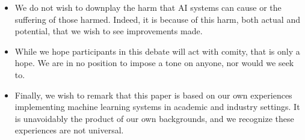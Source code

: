 \documentclass[11pt]{article}
\begin{document}
\begin{itemize}
\item We do not wish to downplay the harm that AI systems can cause or the suffering of those harmed. Indeed, it is because of this harm, both actual and potential, that we wish to see improvements made.

\item While we hope participants in this debate will act with comity, that is only a hope. We are in no position to impose a tone on anyone, nor would we seek to.

\item Finally, we wish to remark that this paper is based on our own experiences implementing machine learning systems in academic and industry settings. It is unavoidably the product of our own backgrounds, and we recognize these experiences are not universal.


\end{itemize}

% 
% 
\end{document}
